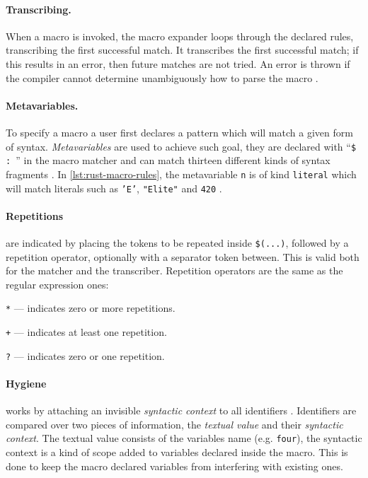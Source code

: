 \paragraph{Transcribing.}
When a macro is invoked, the macro expander loops through the declared rules, transcribing the first successful match.
It transcribes the first successful match; if this results in an error, then future matches are not tried.
An error is thrown if the compiler cannot determine unambiguously how to parse the macro
\autocite[Section 3.1 - Transcribing]{RustRef2021}.

\paragraph{Metavariables.}
To specify a macro a user first declares a pattern which will match a given form of syntax.
\emph{Metavariables} are used to achieve such goal,
they are declared with “\texttt{\$  : }” in the macro matcher and
can match thirteen different kinds of syntax fragments \autocite[Section 3.1 - Metavariables]{RustRef2021}.
In \autoref{lst:rust-macro-rules}, the metavariable \texttt{n} is of kind \texttt{literal}
which will match literals such as \texttt{'E'}, \texttt{"Elite"} and \texttt{420} \autocite[Section 8.2.1]{RustRef2021}.

\paragraph{Repetitions} are indicated by placing the tokens to be repeated inside \texttt{\$(...)},
followed by a repetition operator, optionally with a separator token between.
This is valid both for the matcher and the transcriber.
Repetition operators are the same as the regular expression ones:
\begin{compactitem}
    \item \texttt{*} — indicates zero or more repetitions.
    \item \texttt{+} — indicates at least one repetition.
    \item \texttt{?} — indicates zero or one repetition.
\end{compactitem}

\paragraph{Hygiene} works by attaching an invisible \emph{syntactic context} to all identifiers \autocite{Wirth2021}.
Identifiers are compared over two pieces of information,
the \emph{textual value} and their \emph{syntactic context}.
The textual value consists of the variables name (e.g. \texttt{four}),
the syntactic context is a kind of scope added to variables declared inside the macro.
This is done to keep the macro declared variables from interfering with existing ones.

